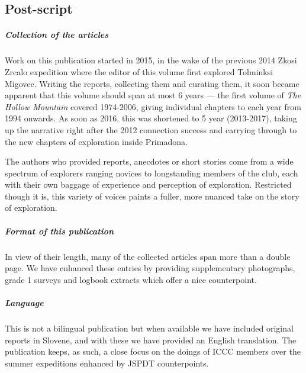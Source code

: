\newpage
 
 \begin{tcolorbox}
 	\begin{fullwidth}
 	\chapter{Post-script}
 		\begin{multicols}{2}


 			\paragraph{Collection of the articles}

 			Work on this publication started in 2015, in the wake of the previous 2014 Zkosi Zrcalo expedition where the editor of this volume first explored Tolminksi Migovec. Writing the reports, collecting them and curating them, it soon became apparent that this volume should span at most 6 years --- the first volume of \emph{The Hollow Mountain} covered 1974-2006, giving individual chapters to each year  from 1994 onwards. As soon as 2016, this was shortened to 5 year (2013-2017), taking up the narrative right after the 2012 connection success and carrying through to the new chapters of exploration inside Primadona.


 			The authors who provided reports, anecdotes or short stories come from a wide spectrum of explorers ranging novices to longstanding members of the club, each with their own baggage of experience and perception of exploration. Restricted though it is, this variety of voices paints a fuller, more nuanced take on the story of exploration.

 			\paragraph{Format of this publication}

 			In view of their length, many of the collected articles span more than a double page. We have enhanced these entries by providing supplementary photographs, grade 1 surveys and logbook extracts which offer a nice counterpoint.


 			\paragraph{Language}

 			This is not a bilingual publication but when available we have included original reports in Slovene, and with these we have provided an English translation. The publication keeps, as such, a close focus on the doings of ICCC members over the summer expeditions enhanced by JSPDT counterpoints. 



\end{multicols}
\end{fullwidth}
\end{tcolorbox}
